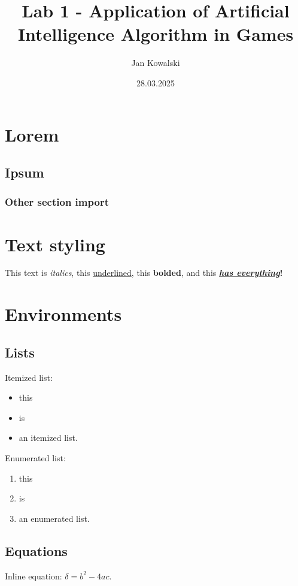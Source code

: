 \documentclass{pwrReport}
\title{Lab 1 - Application of Artificial Intelligence Algorithm in Games}
\author{Jan Kowalski}
\date{28.03.2025}
\begin{document}
\maketitle
\tableofcontents

\newpage

\section{Lorem}
    \subsection{Ipsum}
        \subsubsection{Other section import}
            

\section{Text styling}
    This text is \textit{italics}, this \underline{underlined}, this \textbf{bolded}, and this
    \textbf{\textit{\underline{has everything}}!}


\section{Environments}
    \subsection{Lists}
        Itemized list:
        \begin{itemize}
            \item this
            \item is
            \item an itemized list.
        \end{itemize}

        Enumerated list:
        \begin{enumerate}
            \item this
            \item is
            \item an enumerated list.
        \end{enumerate}

    \subsection{Equations}
        Inline equation: $\delta=b^2-4ac$.
\end{document}
